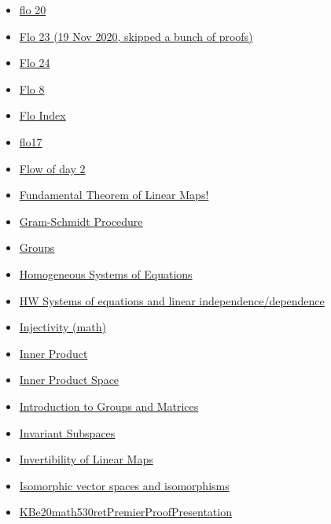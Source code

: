 \documentclass[11pt]{article}
\begin{document}
\begin{itemize}
\begin{itemize}
\begin{itemize}
\item \href{mathematics/linear\_algebra/KBe20math530flo21.org}{flo 20}
\item \href{mathematics/linear\_algebra/KBe20math530flo23.org}{Flo 23 (19 Nov 2020, skipped a bunch of proofs)}
\item \href{mathematics/linear\_algebra/KBe20math530flo24.org}{Flo 24}
\item \href{mathematics/linear\_algebra/Kbe20math530flo8.org}{Flo 8}
\item \href{mathematics/linear\_algebra/KBe2020math530floIndex.org}{Flo Index}
\item \href{mathematics/linear\_algebra/KBe20math530flo17.org}{flo17}
\item \href{mathematics/linear\_algebra/KBe2020math530flo2.org}{Flow of day 2}
\item \href{mathematics/linear\_algebra/KBrefFundamentalTheoremOfLinearMaps.org}{Fundamental Theorem of Linear Maps!}
\item \href{mathematics/linear\_algebra/KBrefGramSchmidtProcedure.org}{Gram-Schmidt Procedure}
\item \href{mathematics/linear\_algebra/KBe2020math530refGroups.org}{Groups}
\item \href{mathematics/linear\_algebra/KBrefHomogeneousSystemsOfEquations.org}{Homogeneous Systems of Equations}
\item \href{mathematics/linear\_algebra/KBe20math530retSysEquationsLinearInDependence.org}{HW Systems of equations and linear independence/dependence}
\item \href{mathematics/linear\_algebra/KBrefInjective.org}{Injectivity (math)}
\item \href{mathematics/linear\_algebra/KBrefInnerProduct.org}{Inner Product}
\item \href{mathematics/linear\_algebra/KBrefInnerProductSpaces.org}{Inner Product Space}
\item \href{mathematics/linear\_algebra/KBxGroupAndMatricesIntro.org}{Introduction to Groups and Matrices}
\item \href{mathematics/linear\_algebra/KBrefInvariantSubspaces.org}{Invariant Subspaces}
\item \href{mathematics/linear\_algebra/KBrefInvertibleLinearMaps.org}{Invertibility of Linear Maps}
\item \href{mathematics/linear\_algebra/KBrefIsomorphicVectorSpace.org}{Isomorphic vector spaces and isomorphisms}
\item \href{mathematics/linear\_algebra/KBe20math530retPremierProofPresentation.org}{KBe20math530retPremierProofPresentation}

\end{itemize}
\end{itemize}
\end{itemize}
\end{document}
